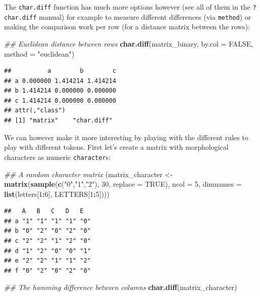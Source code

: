 \documentclass[]{book}
\newenvironment{Shaded}{\begin{snugshade}}{\end{snugshade}}
\newcommand{\CommentTok}[1]{\textcolor[rgb]{0.56,0.35,0.01}{\textit{#1}}}
\newcommand{\DataTypeTok}[1]{\textcolor[rgb]{0.13,0.29,0.53}{#1}}
\newcommand{\DecValTok}[1]{\textcolor[rgb]{0.00,0.00,0.81}{#1}}
\newcommand{\KeywordTok}[1]{\textcolor[rgb]{0.13,0.29,0.53}{\textbf{#1}}}
\newcommand{\NormalTok}[1]{#1}
\newcommand{\OperatorTok}[1]{\textcolor[rgb]{0.81,0.36,0.00}{\textbf{#1}}}
\newcommand{\OtherTok}[1]{\textcolor[rgb]{0.56,0.35,0.01}{#1}}
\newcommand{\StringTok}[1]{\textcolor[rgb]{0.31,0.60,0.02}{#1}}
\begin{document}
The \texttt{char.diff} function has much more options however (see all of them in the \texttt{?char.diff} manual) for example to measure different differences (via \texttt{method}) or making the comparison work per row (for a distance matrix between the rows):

\begin{Shaded}
\begin{Highlighting}[]
\CommentTok{## Euclidean distance between rows}
\KeywordTok{char.diff}\NormalTok{(matrix_binary, }\DataTypeTok{by.col =} \OtherTok{FALSE}\NormalTok{, }\DataTypeTok{method =} \StringTok{"euclidean"}\NormalTok{)}
\end{Highlighting}
\end{Shaded}

\begin{verbatim}
##          a        b        c
## a 0.000000 1.414214 1.414214
## b 1.414214 0.000000 0.000000
## c 1.414214 0.000000 0.000000
## attr(,"class")
## [1] "matrix"    "char.diff"
\end{verbatim}

We can however make it more interesting by playing with the different rules to play with different tokens.
First let's create a matrix with morphological characters as numeric \texttt{character}s:

\begin{Shaded}
\begin{Highlighting}[]
\CommentTok{## A random character matrix}
\NormalTok{(matrix_character <-}\StringTok{ }\KeywordTok{matrix}\NormalTok{(}\KeywordTok{sample}\NormalTok{(}\KeywordTok{c}\NormalTok{(}\StringTok{"0"}\NormalTok{,}\StringTok{"1"}\NormalTok{,}\StringTok{"2"}\NormalTok{), }\DecValTok{30}\NormalTok{, }\DataTypeTok{replace =} \OtherTok{TRUE}\NormalTok{), }\DataTypeTok{ncol =} \DecValTok{5}\NormalTok{,}
                           \DataTypeTok{dimnames =} \KeywordTok{list}\NormalTok{(letters[}\DecValTok{1}\OperatorTok{:}\DecValTok{6}\NormalTok{], LETTERS[}\DecValTok{1}\OperatorTok{:}\DecValTok{5}\NormalTok{])))}
\end{Highlighting}
\end{Shaded}

\begin{verbatim}
##   A   B   C   D   E  
## a "1" "1" "1" "1" "0"
## b "0" "2" "0" "2" "0"
## c "2" "2" "1" "2" "0"
## d "1" "2" "0" "0" "1"
## e "2" "2" "1" "1" "2"
## f "0" "2" "0" "2" "0"
\end{verbatim}

\begin{Shaded}
\begin{Highlighting}[]
\CommentTok{## The hamming difference between columns}
\KeywordTok{char.diff}\NormalTok{(matrix_character)}
\end{Highlighting}
\end{Shaded}
\end{document}

